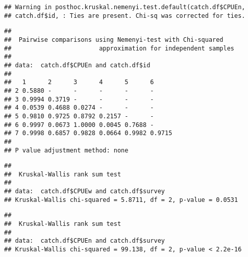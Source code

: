 \documentclass[]{article}
\newenvironment{Shaded}{\begin{snugshade}}{\end{snugshade}}
\newcommand{\KeywordTok}[1]{\textcolor[rgb]{0.13,0.29,0.53}{\textbf{#1}}}
\newcommand{\StringTok}[1]{\textcolor[rgb]{0.31,0.60,0.02}{#1}}
\newcommand{\CommentTok}[1]{\textcolor[rgb]{0.56,0.35,0.01}{\textit{#1}}}
\newcommand{\OperatorTok}[1]{\textcolor[rgb]{0.81,0.36,0.00}{\textbf{#1}}}
\newcommand{\NormalTok}[1]{#1}
\begin{document}
\begin{verbatim}
## Warning in posthoc.kruskal.nemenyi.test.default(catch.df$CPUEn,
## catch.df$id, : Ties are present. Chi-sq was corrected for ties.
\end{verbatim}

\begin{verbatim}
## 
##  Pairwise comparisons using Nemenyi-test with Chi-squared    
##                        approximation for independent samples 
## 
## data:  catch.df$CPUEn and catch.df$id 
## 
##   1      2      3      4      5      6     
## 2 0.5880 -      -      -      -      -     
## 3 0.9994 0.3719 -      -      -      -     
## 4 0.0539 0.4688 0.0274 -      -      -     
## 5 0.9810 0.9725 0.8792 0.2157 -      -     
## 6 0.9997 0.0673 1.0000 0.0045 0.7688 -     
## 7 0.9998 0.6857 0.9828 0.0664 0.9982 0.9715
## 
## P value adjustment method: none
\end{verbatim}

\begin{Shaded}
\end{Shaded}

\begin{verbatim}
## 
##  Kruskal-Wallis rank sum test
## 
## data:  catch.df$CPUEw and catch.df$survey
## Kruskal-Wallis chi-squared = 5.8711, df = 2, p-value = 0.0531
\end{verbatim}

\begin{Shaded}
\end{Shaded}

\begin{verbatim}
## 
##  Kruskal-Wallis rank sum test
## 
## data:  catch.df$CPUEn and catch.df$survey
## Kruskal-Wallis chi-squared = 99.138, df = 2, p-value < 2.2e-16
\end{verbatim}

\begin{Shaded}
\end{Shaded}
\end{document}

